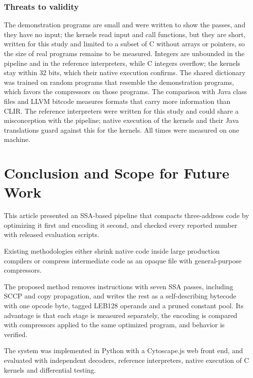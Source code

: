 \documentclass{ieeeaccess}
\newcommand{\clir}{CLIR}
\begin{document}
\subsubsection{Threats to validity}
The demonstration programs are small and were written to show the passes, and they have no input; the kernels read input and call functions, but they are short, written for this study and limited to a subset of C without arrays or pointers, so the size of real programs remains to be measured. Integers are unbounded in the pipeline and in the reference interpreters, while C integers overflow; the kernels stay within 32 bits, which their native execution confirms. The shared dictionary was trained on random programs that resemble the demonstration programs, which favors the compressors on those programs. The comparison with Java class files and LLVM bitcode measures formats that carry more information than \clir{}. The reference interpreters were written for this study and could share a misconception with the pipeline; native execution of the kernels and their Java translations guard against this for the kernels. All times were measured on one machine.

\section{Conclusion and Scope for Future Work}
\label{sec:conclusion}
This article presented an SSA-based pipeline that compacts three-address code by optimizing it first and encoding it second, and checked every reported number with released evaluation scripts.

Existing methodologies either shrink native code inside large production compilers or compress intermediate code as an opaque file with general-purpose compressors.

The proposed method removes instructions with seven SSA passes, including SCCP and copy propagation, and writes the rest as a self-describing bytecode with one opcode byte, tagged LEB128 operands and a pruned constant pool. Its advantage is that each stage is measured separately, the encoding is compared with compressors applied to the same optimized program, and behavior is verified.

The system was implemented in Python with a Cytoscape.js web front end, and evaluated with independent decoders, reference interpreters, native execution of C kernels and differential testing.
\end{document}
